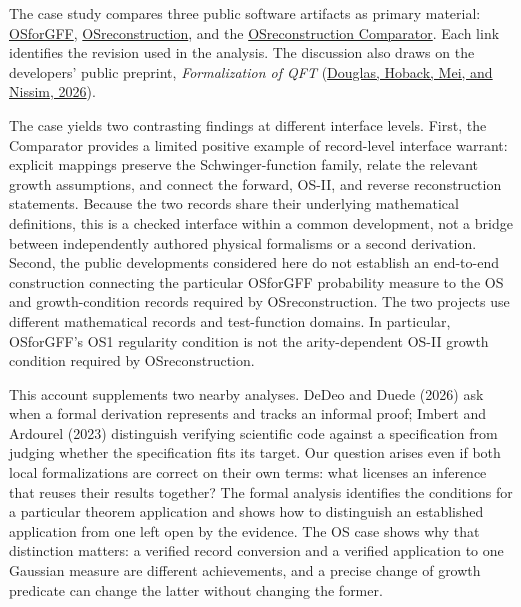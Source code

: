 \documentclass[pdflatex,sn-apa]{sn-jnl}
\begin{document}
The case study compares three public software artifacts as primary material: \href{https://github.com/mrdouglasny/OSforGFF/tree/fef84a82937dfd2bb7f672108a72da329d3ef0fd}{OSforGFF}, \href{https://github.com/xiyin137/OSreconstruction/tree/cf0904e34a7c146a9f312f601e3707dca4a87697}{OSreconstruction}, and the \href{https://github.com/mrdouglasny/OSreconstruction-comparator/tree/93cdb40e728ba27b7b1b55efc30d57f7b43de9aa}{OSreconstruction Comparator}. Each link identifies the revision used in the analysis. The discussion also draws on the developers' public preprint, \emph{Formalization of QFT} (\href{https://arxiv.org/abs/2603.15770}{Douglas, Hoback, Mei, and Nissim, 2026}).

The case yields two contrasting findings at different interface levels. First, the Comparator provides a limited positive example of record-level interface warrant: explicit mappings preserve the Schwinger-function family, relate the relevant growth assumptions, and connect the forward, OS-II, and reverse reconstruction statements. Because the two records share their underlying mathematical definitions, this is a checked interface within a common development, not a bridge between independently authored physical formalisms or a second derivation. Second, the public developments considered here do not establish an end-to-end construction connecting the particular OSforGFF probability measure to the OS and growth-condition records required by OSreconstruction. The two projects use different mathematical records and test-function domains. In particular, OSforGFF's OS1 regularity condition is not the arity-dependent OS-II growth condition required by OSreconstruction.

This account supplements two nearby analyses. DeDeo and Duede (2026) ask when a formal derivation represents and tracks an informal proof; Imbert and Ardourel (2023) distinguish verifying scientific code against a specification from judging whether the specification fits its target. Our question arises even if both local formalizations are correct on their own terms: what licenses an inference that reuses their results together? The formal analysis identifies the conditions for a particular theorem application and shows how to distinguish an established application from one left open by the evidence. The OS case shows why that distinction matters: a verified record conversion and a verified application to one Gaussian measure are different achievements, and a precise change of growth predicate can change the latter without changing the former.
\end{document}
